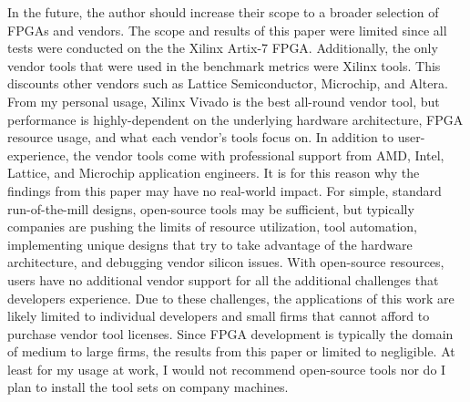 \documentclass{article}
\begin{document}
In the future, the author should increase their scope to a broader selection of FPGAs and vendors. 
The scope and results of this paper were limited since all tests were conducted on the the Xilinx Artix-7 FPGA. 
Additionally, the only vendor tools that were used in the benchmark metrics were Xilinx tools. 
This discounts other vendors such as Lattice Semiconductor, Microchip, and Altera. 
From my personal usage, Xilinx Vivado is the best all-round vendor tool, but performance is highly-dependent on the underlying hardware architecture, FPGA resource usage, and what each vendor's tools focus on. 
In addition to user-experience, the vendor tools come with professional support from AMD, Intel, Lattice, and Microchip application engineers. 
It is for this reason why the findings from this paper may have no real-world impact. 
For simple, standard run-of-the-mill designs, open-source tools may be sufficient, but typically companies are pushing the limits of resource utilization, tool automation, implementing unique designs that try to take advantage of the hardware architecture, and debugging vendor silicon issues. 
With open-source resources, users have no additional vendor support for all the additional challenges that developers experience. 
Due to these challenges, the applications of this work are likely limited to individual developers and small firms that cannot afford to purchase vendor tool licenses. 
Since FPGA development is typically the domain of medium to large firms, the results from this paper or limited to negligible. 
At least for my usage at work, I would not recommend open-source tools nor do I plan to install the tool sets on company machines.

\nocite{*}



\end{document}
